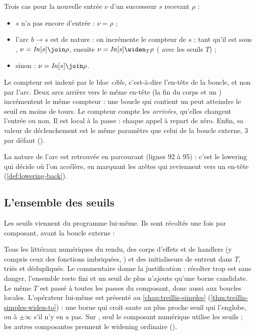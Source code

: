Trois cas pour la nouvelle entrée $\nu$ d'un successeur $s$ recevant $\rho$ :
\begin{itemize}
  \item $s$ n'a pas encore d'entrée : $\nu = \rho$ ;
  \item l'arc $b \to s$ est de nature  : on incrémente le
    compteur de $s$ ; tant qu'il est sous ,
    $\nu = \mathit{In}[s] \join \rho$, ensuite
    $\nu = \mathit{In}[s] \widen_T \rho$ ( avec les seuils $T$) ;
  \item sinon : $\nu = \mathit{In}[s] \join \rho$.
\end{itemize}

Le compteur  est indexé par le bloc \emph{cible},
c'est-à-dire l'en-tête de la boucle, et non par l'arc. Deux arcs arrière vers
le même en-tête (la fin du corps et un ) incrémentent le même
compteur : une boucle qui contient un  peut atteindre le seuil
en moins de tours. Le compteur compte les \emph{arrivées}, qu'elles changent
l'entrée ou non. Il est local à la passe : chaque appel à 
repart de zéro. Enfin, sa valeur de déclenchement  est
le même paramètre que celui de la boucle externe, 3 par défaut
().

La nature de l'arc est retrouvée en parcourant  (lignes 92 à
95) : c'est le lowering qui décide où l'on accélère, en marquant 
les arêtes qui reviennent vers un en-tête (\cref{def:lowering-back}).

\subsection{L'ensemble des seuils}

Les seuils viennent du programme lui-même. Ils sont récoltés une fois par
composant, avant la boucle externe :


Tous les littéraux numériques du rendu, des corps d'effets et de handlers
(y compris ceux des fonctions imbriquées, )
et des initialiseurs de  entrent dans $T$, triés et dédupliqués.
Le commentaire donne la justification : récolter trop est sans danger,
l'ensemble reste fini et un seuil de plus n'ajoute qu'une borne candidate. Le
même $T$ est passé à toutes les passes du composant, donc aussi aux boucles
locales. L'opérateur  lui-même est présenté au
\cref{chap:treillis-simples} (\cref{thm:treillis-simples-widen-to}) : une
borne qui croît saute au plus proche seuil qui l'englobe, ou à $\pm\infty$
s'il n'y en a pas. Sur , seul le composant numérique utilise
les seuils ; les autres composantes prennent le widening ordinaire
().


